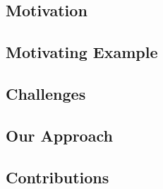 \placeholder

\subsection{Motivation}
\placeholder

\subsection{Motivating Example}
\placeholder

\subsection{Challenges}
\placeholder

\subsection{Our Approach}
\placeholder

\subsection{Contributions}
\placeholder
